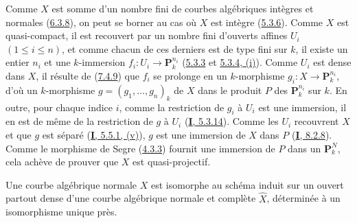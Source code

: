 Comme $X$ est somme d'un nombre fini de courbes algébriques intègres et
normales (\hyperref[II.6.3.8-fr]{6.3.8}), on peut se borner au cas où $X$ est
intègre (\hyperref[II.5.3.6-fr]{5.3.6}). Comme $X$ est quasi-compact, il est
recouvert par un nombre fini d'ouverts affines $U_i$ $(1\leq i\leq n)$, et
comme chacun de ces derniers est de type fini sur $k$, il existe un entier
$n_i$ et une $k$-immersion $f_i:U_i\to\mathbf{P}_k^{n_i}$
(\hyperref[II.5.3.3-fr]{5.3.3} et
\hyperref[II.5.3.4-fr]{5.3.4, (i)}). Comme $U_i$ est dense dans $X$, il résulte
de (\hyperref[II.7.4.9-fr]{7.4.9}) que $f_i$ se prolonge en un $k$-morphisme
$g_i:X\to\mathbf{P}_k^{n_i}$, d'où un $k$-morphisme
$g=(g_1,\ldots,g_n)_k$ de $X$ dans le produit $P$ des
$\mathbf{P}_k^{n_i}$ sur $k$. En outre, pour chaque indice $i$, comme la
restriction de $g_i$ à $U_i$ est une immersion, il en est de même de la
restriction de $g$ à $U_i$ (\hyperref[I.5.3.14-fr]{\textbf{I}, 5.3.14}). Comme les
$U_i$ recouvrent $X$ et que $g$ est séparé
(\hyperref[I.5.5.1-fr]{\textbf{I}, 5.5.1, (v)}), $g$ est une immersion de $X$ dans $P$
(\hyperref[I.8.2.8-fr]{\textbf{I}, 8.2.8}). Comme le morphisme de Segre
(\hyperref[II.4.3.3-fr]{4.3.3}) fournit une immersion de $P$ dans un
$\mathbf{P}_k^N$, cela achève de prouver que $X$ est quasi-projectif.

\begin{corollary}[7.4.11]
\label{II.7.4.11-fr}
Une courbe algébrique normale $X$ est isomorphe au schéma induit sur un ouvert
partout dense d'une courbe algébrique normale et complète $\widehat{X}$,
déterminée à un isomorphisme unique près.
\end{corollary}

